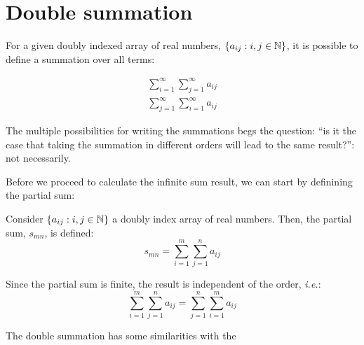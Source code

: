 \section{Double summation}

For a given doubly indexed array of real numbers, $\{ a_{ij} : i, j \in \mathbb{N}\}$, it is possible to define a summation over all terms:

\begin{eqnarray*}
    \sum \limits_{i=1}^\infty \sum \limits_{j=1}^\infty a_{ij} \\
    \sum \limits_{j=1}^\infty \sum \limits_{i=1}^\infty a_{ij}
\end{eqnarray*}

The multiple possibilities for writing the summations begs the question: ``is it the case that taking the summation in different orders will lead to the same result?'': not necessarily.

Before we proceed to calculate the infinite sum result, we can start by definining the partial sum:

\begin{definition}
    Consider $\{a_{ij}: i,j \in \mathbb{N}\}$ a doubly index array of real numbers. Then, the partial sum, $s_{mn}$, is defined:
    \begin{equation*}
        s_{mn} = \sum \limits_{i=1}^m \sum \limits_{j=1}^n a_{ij}
    \end{equation*}
\end{definition}

\begin{remark}
    Since the partial sum is finite, the result is independent of the order, \emph{i.e.}:
    \begin{equation*}
        \sum \limits_{i=1}^m \sum \limits_{j=1}^n a_{ij}
        = \sum \limits_{j=1}^n \sum \limits_{i=1}^m a_{ij}
    \end{equation*}
\end{remark}

\vspace{1em}

The double summation has some similarities with the 